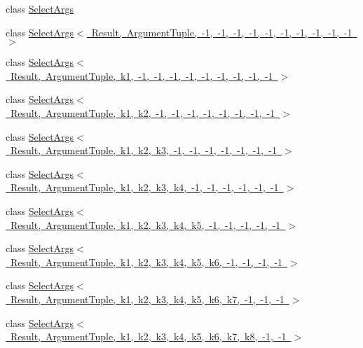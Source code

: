 \begin{DoxyCompactItemize}
\item 
class \mbox{\hyperlink{classtesting_1_1internal_1_1_select_args}{Select\+Args}}
\item 
class \mbox{\hyperlink{classtesting_1_1internal_1_1_select_args_3_01_result_00_01_argument_tuple_00_01-1_00_01-1_00_01-99299a766a33bd3110e39f51f43b194a}{Select\+Args$<$ Result, Argument\+Tuple, -\/1, -\/1, -\/1, -\/1, -\/1, -\/1, -\/1, -\/1, -\/1, -\/1 $>$}}
\item 
class \mbox{\hyperlink{classtesting_1_1internal_1_1_select_args_3_01_result_00_01_argument_tuple_00_01k1_00_01-1_00_01-33116bd77067572e384b90e7c70b03c4}{Select\+Args$<$ Result, Argument\+Tuple, k1, -\/1, -\/1, -\/1, -\/1, -\/1, -\/1, -\/1, -\/1, -\/1 $>$}}
\item 
class \mbox{\hyperlink{classtesting_1_1internal_1_1_select_args_3_01_result_00_01_argument_tuple_00_01k1_00_01k2_00_01-03e4fb75e6504ae34fdb48d64bb6de95}{Select\+Args$<$ Result, Argument\+Tuple, k1, k2, -\/1, -\/1, -\/1, -\/1, -\/1, -\/1, -\/1, -\/1 $>$}}
\item 
class \mbox{\hyperlink{classtesting_1_1internal_1_1_select_args_3_01_result_00_01_argument_tuple_00_01k1_00_01k2_00_01k43121451b69bc30ee1dad887e67d8807}{Select\+Args$<$ Result, Argument\+Tuple, k1, k2, k3, -\/1, -\/1, -\/1, -\/1, -\/1, -\/1, -\/1 $>$}}
\item 
class \mbox{\hyperlink{classtesting_1_1internal_1_1_select_args_3_01_result_00_01_argument_tuple_00_01k1_00_01k2_00_01k7cadbb88f40ff7408f8c070bb61c70db}{Select\+Args$<$ Result, Argument\+Tuple, k1, k2, k3, k4, -\/1, -\/1, -\/1, -\/1, -\/1, -\/1 $>$}}
\item 
class \mbox{\hyperlink{classtesting_1_1internal_1_1_select_args_3_01_result_00_01_argument_tuple_00_01k1_00_01k2_00_01k6061407a5fa2cad2c495e8e16ee67874}{Select\+Args$<$ Result, Argument\+Tuple, k1, k2, k3, k4, k5, -\/1, -\/1, -\/1, -\/1, -\/1 $>$}}
\item 
class \mbox{\hyperlink{classtesting_1_1internal_1_1_select_args_3_01_result_00_01_argument_tuple_00_01k1_00_01k2_00_01k203aa538560773abfacd746d313c06ae}{Select\+Args$<$ Result, Argument\+Tuple, k1, k2, k3, k4, k5, k6, -\/1, -\/1, -\/1, -\/1 $>$}}
\item 
class \mbox{\hyperlink{classtesting_1_1internal_1_1_select_args_3_01_result_00_01_argument_tuple_00_01k1_00_01k2_00_01kf4b89906ed32c76471b80b75f77e1355}{Select\+Args$<$ Result, Argument\+Tuple, k1, k2, k3, k4, k5, k6, k7, -\/1, -\/1, -\/1 $>$}}
\item 
class \mbox{\hyperlink{classtesting_1_1internal_1_1_select_args_3_01_result_00_01_argument_tuple_00_01k1_00_01k2_00_01ke29a32f440a8fcb098d8685a265f9f40}{Select\+Args$<$ Result, Argument\+Tuple, k1, k2, k3, k4, k5, k6, k7, k8, -\/1, -\/1 $>$}}

\end{DoxyCompactItemize}
